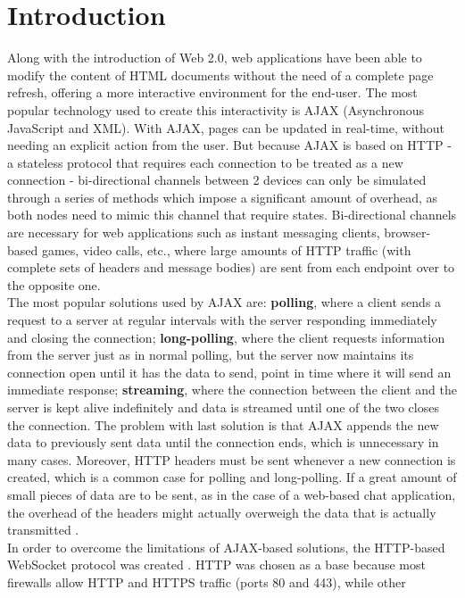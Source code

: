 \documentclass[conference]{IEEEtran}
\begin{document}
\section{Introduction}
Along with the introduction of Web 2.0, web applications have been able to
modify the content of HTML documents without the need of a complete page
refresh, offering a more interactive environment for the end-user.
The most popular technology used to create this interactivity is AJAX \cite{AJAX}
(Asynchronous JavaScript and XML). With AJAX, pages can be updated in real-time,
without needing an explicit action from the user. But because AJAX is based on
HTTP - a stateless protocol that requires each connection to be treated as a new
connection - bi-directional channels between 2 devices can only be simulated
through a series of methods which impose a significant amount of overhead, as both
nodes need to mimic this channel that require states.
Bi-directional channels are necessary for web applications such as instant
messaging clients, browser-based games, video calls, etc., where large amounts
of HTTP traffic (with complete sets of headers and message bodies) are sent from
each endpoint over to the opposite one.
\\
\indent
The most popular solutions used by AJAX are: \textbf{polling}, where a client sends
a request to a server at regular intervals with the server responding immediately
and closing the connection; \textbf{long-polling}, where the client requests
information from the server just as in normal polling, but the server now maintains
its connection open until it has the data to send, point in time where
it will send an immediate response;
\textbf{streaming}, where the connection between the client and the server is
kept alive indefinitely and data is streamed until one of the two closes the
connection. The problem with last solution is that AJAX
appends the new data to previously sent data until the connection ends, which is
unnecessary in many cases. Moreover, HTTP headers must be sent whenever a new
connection is created, which is a common case for polling and long-polling. If
a great amount of small pieces of data are to be sent, as in the case of a
web-based chat application, the overhead of the headers might actually overweigh
the data that is actually transmitted \cite{2009:Misc}.
\\
\indent
In order to overcome the limitations of AJAX-based solutions, the HTTP-based
WebSocket protocol was created \cite{RFC}. HTTP was chosen as a base because
most firewalls allow HTTP and HTTPS traffic  (ports 80 and 443), while other
\end{document}
